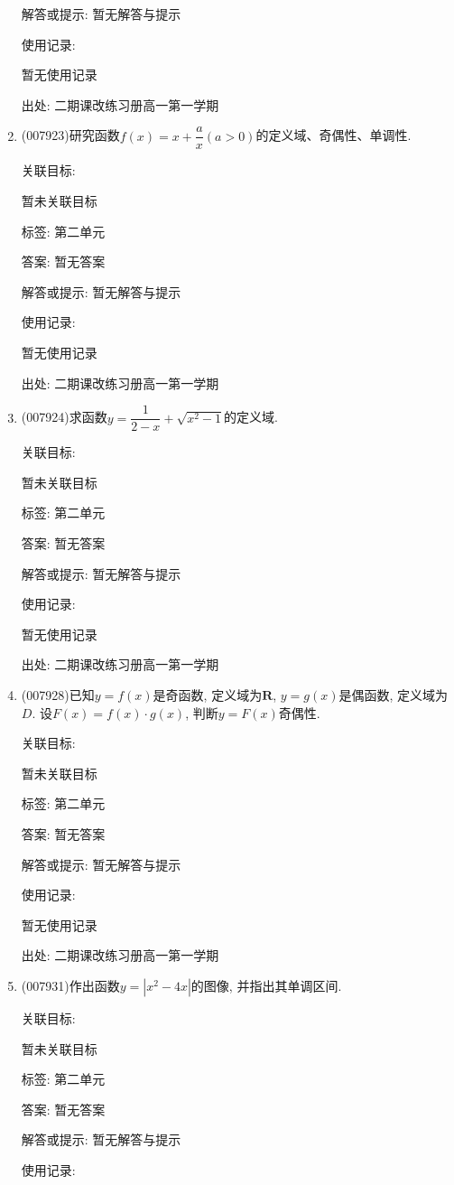 \documentclass[10pt,a4paper]{article}
\begin{document}
\begin{enumerate}[1.]
解答或提示: 暂无解答与提示

使用记录:

暂无使用记录


出处: 二期课改练习册高一第一学期
\item { (007923)}研究函数$f(x)=x+\dfrac ax(a>0)$的定义域、奇偶性、单调性.


关联目标:

暂未关联目标



标签: 第二单元

答案: 暂无答案

解答或提示: 暂无解答与提示

使用记录:

暂无使用记录


出处: 二期课改练习册高一第一学期
\item { (007924)}求函数$y=\dfrac 1{2-x}+\sqrt {x^2-1}$的定义域.


关联目标:

暂未关联目标



标签: 第二单元

答案: 暂无答案

解答或提示: 暂无解答与提示

使用记录:

暂无使用记录


出处: 二期课改练习册高一第一学期
\item { (007928)}已知$y=f(x)$是奇函数, 定义域为$\mathbf{R}$, $y=g(x)$是偶函数, 定义域为$D$. 设$F(x)=f(x)\cdot g(x)$, 判断$y=F(x)$奇偶性.


关联目标:

暂未关联目标



标签: 第二单元

答案: 暂无答案

解答或提示: 暂无解答与提示

使用记录:

暂无使用记录


出处: 二期课改练习册高一第一学期
\item { (007931)}作出函数$y=|x^2-4x|$的图像, 并指出其单调区间.


关联目标:

暂未关联目标



标签: 第二单元

答案: 暂无答案

解答或提示: 暂无解答与提示

使用记录:


\end{enumerate}
\end{document}
